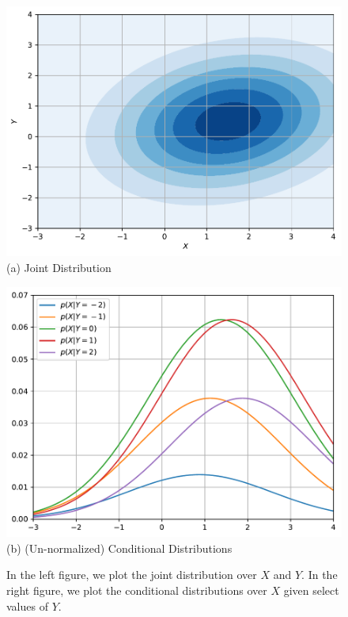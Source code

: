 \documentclass{report}
\begin{document}
\begin{figure}[t]
    \begin{minipage}{0.48\textwidth}
        \centering
        \includegraphics[width=\columnwidth]{figures/joint.pdf}
        (a) Joint Distribution
    \end{minipage}
    \hfill
    \begin{minipage}{0.48\textwidth}
        \centering
        \includegraphics[width=\columnwidth]{figures/conditionals.pdf}
        (b) (Un-normalized) Conditional Distributions
    \end{minipage}
    \caption{
        \label{fig:conditionals}
        In the left figure, we plot the joint distribution over $X$ and $Y$. In
        the right figure, we plot the conditional distributions over $X$ given
        select values of $Y$.
    }
\end{figure}
\end{document}
